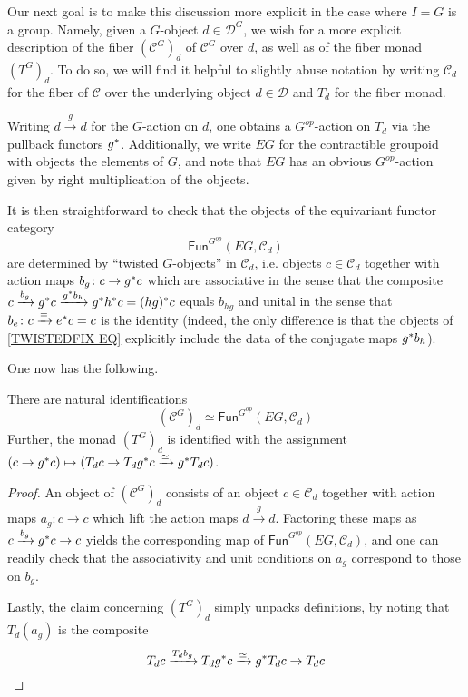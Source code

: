 \documentclass[a4paper,10pt
,draft
]{article}%
\renewcommand{\1}{\eta}%
\begin{document}
Our next goal is to make this discussion more explicit in the case where
$I=G$ is a group.
Namely, given a $G$-object $d \in \mathcal{D}^G$,
we wish for a more explicit description of the fiber
$\left(\mathcal{C}^G\right)_d$ of $\mathcal{C}^G$ over $d$,
as well as of the fiber monad $(T^G)_d$.
To do so, we will find it helpful to slightly abuse notation by writing $\mathcal{C}_d$ for the fiber of $\mathcal{C}$ over the underlying object $d \in \mathcal{D}$ and $T_d$ for the fiber monad.

Writing $d\xrightarrow{g} d$ for the $G$-action on $d$, one obtains a  $G^{op}$-action on $T_d$ via the pullback functors $g^{\**}$.
Additionally, we write $EG$ for the contractible groupoid with objects the elements of $G$, and note that $EG$ has an obvious 
$G^{op}$-action given by right multiplication of the objects.

It is then straightforward to check that the objects of the equivariant functor category
\begin{equation}\label{TWISTEDFIX EQ}
\mathsf{Fun}^{G^{op}}(EG,\mathcal{C}_d)
\end{equation}
are determined by ``twisted $G$-objects'' in $\mathcal{C}_d$, i.e. objects 
$c\in \mathcal{C}_d$
together with action maps 
$b_g \colon c \to g^{\**}c$
which are associative in the sense that the composite
$c \xrightarrow{b_g} g^{\**}c \xrightarrow{g^{\**}b_h} g^{\**} h^{\**} c = (hg)^{\**}c$ equals $b_{hg}$
and unital in the sense that
$b_e \colon c \xrightarrow{=} e^{\**}c = c$
is the identity
(indeed, the only difference is that the
objects of \ref{TWISTEDFIX EQ} explicitly include the data
of the conjugate maps $g^{\**}b_h$).

One now has the following.



\begin{proposition}
There are natural identifications
\[
\left(\mathcal{C}^G\right)_d \simeq
\mathsf{Fun}^{G^{op}}(EG,\mathcal{C}_d)
\]
Further, the monad $\left(T^G\right)_d$
is identified with the assignment
$(c \to g^{\**}c) \mapsto 
(T_d c \to T_dg^{\**}c \xrightarrow{\simeq} g^{\**}T_d c)$.
\end{proposition}



\begin{proof}
An object of $\left(\mathcal{C}^G\right)_d$
consists of an object $c \in \mathcal{C}_d$ together with action maps
$a_g\colon c \to c$ which lift the action maps $d \xrightarrow{g} d$.
Factoring these maps
as $c \xrightarrow{b_g} g^{\**}c \to c$
yields the corresponding map of $\mathsf{Fun}^{G^{op}}(EG,\mathcal{C}_d)$,
and one can readily check that the associativity and unit conditions on $a_g$ correspond to those on $b_g$.

Lastly, the claim concerning $\left(T^G\right)_d$ simply unpacks definitions, by noting that
$T_d(a_g)$ is the composite
\[
T_d c \xrightarrow{T_d b_g}
T_d g^{\**} c \xrightarrow{\simeq} 
g^{\**} T_d c  \to T_d c 
\]
\end{proof}

\fi




{}

\end{document}
